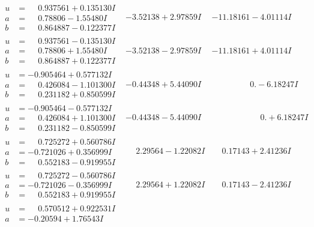 \documentclass[1p]{elsarticle_modified}
\theoremstyle{definition}
\begin{document}
$$\begin{array}{c|c|c}
\begin{aligned}
u &= \phantom{-}0.937561 + 0.135130 I \\
a &= \phantom{-}0.78806 - 1.55480 I \\
b &= \phantom{-}0.864887 - 0.122377 I\end{aligned}
 & -3.52138 + 2.97859 I & -11.18161 - 4.01114 I \\ \hline\begin{aligned}
u &= \phantom{-}0.937561 - 0.135130 I \\
a &= \phantom{-}0.78806 + 1.55480 I \\
b &= \phantom{-}0.864887 + 0.122377 I\end{aligned}
 & -3.52138 - 2.97859 I & -11.18161 + 4.01114 I \\ \hline\begin{aligned}
u &= -0.905464 + 0.577132 I \\
a &= \phantom{-}0.426084 - 1.101300 I \\
b &= \phantom{-}0.231182 + 0.850599 I\end{aligned}
 & -0.44348 + 5.44090 I & \phantom{-0.000000 } 0. - 6.18247 I \\ \hline\begin{aligned}
u &= -0.905464 - 0.577132 I \\
a &= \phantom{-}0.426084 + 1.101300 I \\
b &= \phantom{-}0.231182 - 0.850599 I\end{aligned}
 & -0.44348 - 5.44090 I & \phantom{-0.000000 -}0. + 6.18247 I \\ \hline\begin{aligned}
u &= \phantom{-}0.725272 + 0.560786 I \\
a &= -0.721026 + 0.356999 I \\
b &= \phantom{-}0.552183 - 0.919955 I\end{aligned}
 & \phantom{-}2.29564 - 1.22082 I & \phantom{-}0.17143 + 2.41236 I \\ \hline\begin{aligned}
u &= \phantom{-}0.725272 - 0.560786 I \\
a &= -0.721026 - 0.356999 I \\
b &= \phantom{-}0.552183 + 0.919955 I\end{aligned}
 & \phantom{-}2.29564 + 1.22082 I & \phantom{-}0.17143 - 2.41236 I \\ \hline\begin{aligned}
u &= \phantom{-}0.570512 + 0.922531 I \\
a &= -0.20594 + 1.76543 I \\

\end{aligned}
\end{array}$$
\end{document}
